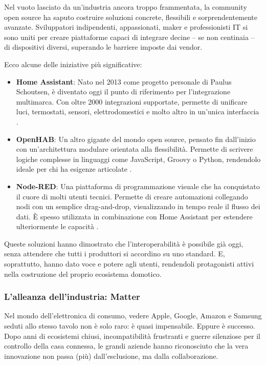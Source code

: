 Nel vuoto lasciato da un’industria ancora troppo frammentata, la community open source ha saputo costruire soluzioni concrete, flessibili e sorprendentemente avanzate. Sviluppatori indipendenti, appassionati, maker e professionisti IT si sono uniti per creare piattaforme capaci di integrare decine – se non centinaia – di dispositivi diversi, superando le barriere imposte dai vendor.

Ecco alcune delle iniziative più significative:

\begin{itemize}
    \item \textbf{Home Assistant}: Nato nel 2013 come progetto personale di Paulus Schoutsen, è diventato oggi il punto di riferimento per l’integrazione multimarca. Con oltre 2000 integrazioni supportate, permette di unificare luci, termostati, sensori, elettrodomestici e molto altro in un’unica interfaccia \cite{HomeAssistant2024}.

    \item \textbf{OpenHAB}: Un altro gigante del mondo open source, pensato fin dall’inizio con un’architettura modulare orientata alla flessibilità. Permette di scrivere logiche complesse in linguaggi come JavaScript, Groovy o Python, rendendolo ideale per chi ha esigenze articolate \cite{OpenHAB2023}.

    \item \textbf{Node-RED}: Una piattaforma di programmazione visuale che ha conquistato il cuore di molti utenti tecnici. Permette di creare automazioni collegando nodi con un semplice drag-and-drop, visualizzando in tempo reale il flusso dei dati. È spesso utilizzata in combinazione con Home Assistant per estendere ulteriormente le capacità \cite{NodeRED2024}.
\end{itemize}

Queste soluzioni hanno dimostrato che l’interoperabilità è possibile già oggi, senza attendere che tutti i produttori si accordino su uno standard. E, soprattutto, hanno dato voce e potere agli utenti, rendendoli protagonisti attivi nella costruzione del proprio ecosistema domotico.


\subsubsection{L'alleanza dell'industria: Matter}

Nel mondo dell’elettronica di consumo, vedere Apple, Google, Amazon e Samsung seduti allo stesso tavolo non è solo raro: è quasi impensabile. Eppure è successo. Dopo anni di ecosistemi chiusi, incompatibilità frustranti e guerre silenziose per il controllo della casa connessa, le grandi aziende hanno riconosciuto che la vera innovazione non passa (più) dall’esclusione, ma dalla collaborazione.

